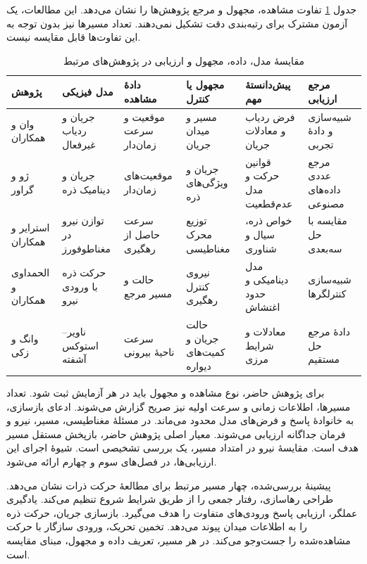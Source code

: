 جدول \ref{tab:lit-inverse-information-comparison} تفاوت مشاهده، مجهول و مرجع پژوهش‌ها را نشان می‌دهد.
این مطالعات، یک آزمون مشترک برای رتبه‌بندی دقت تشکیل نمی‌دهند.
تعداد مسیرها نیز بدون توجه به این تفاوت‌ها قابل مقایسه نیست.

\begin{table}[p]
\centering
\small
\caption{مقایسهٔ مدل، داده، مجهول و ارزیابی در پژوهش‌های مرتبط}
\label{tab:lit-inverse-information-comparison}
\setlength{\tabcolsep}{3pt}
\begin{tabular}{p{}p{}p{}p{}p{}p{}}
\hline
پژوهش & مدل فیزیکی & دادهٔ مشاهده & مجهول یا کنترل & پیش‌دانستهٔ مهم & مرجع ارزیابی \\
\hline
وان و همکاران \cite{Wan2026TrajectoryFlowNet}
& جریان و ردیاب غیرفعال
& موقعیت و سرعت زمان‌دار
& مسیر و میدان جریان
& فرض ردیاب و معادلات جریان
& شبیه‌سازی و دادهٔ تجربی \\
ژو و گراور \cite{ZhouGrauer2026Joint}
& جریان و دینامیک ذره
& موقعیت‌های زمان‌دار
& جریان و ویژگی‌های ذره
& قوانین حرکت و مدل عدم‌قطعیت
& مرجع عددی داده‌های مصنوعی \\
استرایر و همکاران \cite{Strayer2024ForceMapping}
& توازن نیرو در مغناطوفورز
& سرعت حاصل از رهگیری
& توزیع محرک مغناطیسی
& خواص ذره، سیال و شناوری
& مقایسه با حل سه‌بعدی \\
الحمداوی و همکاران \cite{ElHamdaoui2026Tracking}
& حرکت ذره با ورودی نیرو
& حالت و مسیر مرجع
& نیروی کنترل رهگیری
& مدل دینامیکی و حدود اغتشاش
& شبیه‌سازی کنترلگرها \\
وانگ و زکی \cite{WangZaki2025OuterObservations}
& ناویر–استوکس آشفته
& سرعت ناحیهٔ بیرونی
& حالت جریان و کمیت‌های دیواره
& معادلات و شرایط مرزی
& دادهٔ مرجع حل مستقیم \\
\hline
\end{tabular}
\end{table}

برای پژوهش حاضر، نوع مشاهده و مجهول باید در هر آزمایش ثبت شود.
تعداد مسیرها، اطلاعات زمانی و سرعت اولیه نیز صریح گزارش می‌شوند.
ادعای بازسازی، به خانوادهٔ پاسخ و فرض‌های مدل محدود می‌ماند.
در مسئلهٔ مغناطیسی، مسیر، نیرو و فرمان جداگانه ارزیابی می‌شوند.
معیار اصلی پژوهش حاضر، بازپخش مستقل مسیر هدف است.
مقایسهٔ نیرو در امتداد مسیر، یک بررسی تشخیصی است.
شیوهٔ اجرای این ارزیابی‌ها، در فصل‌های سوم و چهارم ارائه می‌شود.

\label{sec:lit-review-synthesis}

پیشینهٔ بررسی‌شده، چهار مسیر مرتبط برای مطالعهٔ حرکت ذرات نشان می‌دهد.
طراحی رهاسازی، رفتار جمعی را از طریق شرایط شروع تنظیم می‌کند.
یادگیری عملگر، ارزیابی پاسخ ورودی‌های متفاوت را هدف می‌گیرد.
بازسازی جریان، حرکت ذره را به اطلاعات میدان پیوند می‌دهد.
تخمین تحریک، ورودی سازگار با حرکت مشاهده‌شده را جست‌وجو می‌کند.
در هر مسیر، تعریف داده و مجهول، مبنای مقایسه است.


